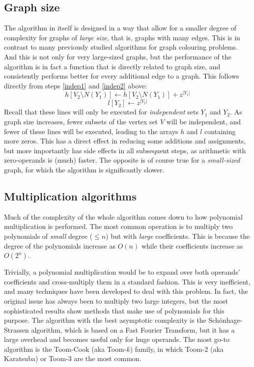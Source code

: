 \documentclass{cslthse-msc}
\begin{document}
\subsection{Graph size}\label{graphdensity}
The algorithm in itself is designed in a way that allow for a smaller degree of complexity for graphs of \emph{large size}, that is, graphs with many edges. This is in contrast to many previously studied algorithms for graph colouring problems. And this is not only for very large-sized graphs, but the performance of the algorithm is in fact a function that is directly related to graph size, and consistently performs better for every additional edge to a graph. This follows directly from steps \ref{indep1} and \ref{indep2} above:
\[ h[V_2 \setminus N(Y_1)] \leftarrow h[V_2 \setminus N(Y_1)] + z^{|Y_1|} \]
\[ l[Y_2] \leftarrow z^{|Y_2|} \]
Recall that these lines will only be executed for \emph{independent} sets $Y_1$ and $Y_2$. As graph size increases, fewer subsets of the vertex set $V$ will be independent, and fewer of these lines will be executed, leading to the arrays $h$ and $l$ containing more zeros. This has a direct effect in reducing some additions and assignments, but more importantly has side effects in all subsequent steps, as arithmetic with zero-operands is (much) faster. The opposite is of course true for a \emph{small-sized} graph, for which the algorithm is significantly slower.

\subsection{Multiplication algorithms}
Much of the complexity of the whole algorithm comes down to how polynomial multiplication is performed. The most common operation is to multiply two polynomials of \emph{small} degree ($\leq n$) but with \emph{large} coefficients. This is because the degree of the polynomials increase as $O(n)$ while their coefficients increase as $O(2^n)$.

Trivially, a polynomial multiplication would be to expand over both operands' coefficients and cross-multiply them in a standard fashion. This is very inefficient, and many techniques have been developed to deal with this problem. In fact, the original issue has always been to multiply two large integers, but the most sophisticated results show methods that make use of polynomials for this purpose. The algorithm with the best asymptotic complexity is the Schönhage-Strassen algorithm, which is based on a Fast Fourier Transform, but it has a large overhead and becomes useful only for huge operands. The most go-to algorithm is the Toom-Cook (aka Toom-$k$) family, in which Toom-2 (aka Karatsuba) or Toom-3 are the most common.
\end{document}

